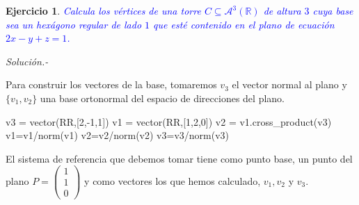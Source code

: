 \documentclass{amsart}
\newtheorem{ejer}{Ejercicio}
\begin{document}
\begin{sagesub}
\begin{center}
\end{center}
\end{sagesub}


\newpage



\begin{ejer}
\textcolor{blue}{Calcula los vértices de una {\sc torre} $C \subseteq \mathcal{A}^3(\mathbb R)$ de altura $3$ cuya base 
sea un hexágono regular de lado $1$ que esté contenido en el plano de ecuación $2x-y+z=1$. }
\end{ejer}

{\it Solución.-}



Para construir los vectores de la base, tomaremos $v_3$ el vector normal al plano y
$\{v_1, v_2\}$ una base ortonormal del espacio de direcciones del plano.

\begin{sageblock}
v3 = vector(RR,[2,-1,1])
v1 = vector(RR,[1,2,0])
v2 = v1.cross_product(v3)
v1=v1/norm(v1)
v2=v2/norm(v2)
v3=v3/norm(v3)
\end{sageblock}

El sistema de referencia que debemos tomar tiene como punto base, un punto del plano $P = \left( \begin{array}{r} 1 \\ 1 \\ 0 \end{array} \right)$ y como vectores los que hemos calculado, $v_1, v_2$ y $v_3$.
\end{document}
